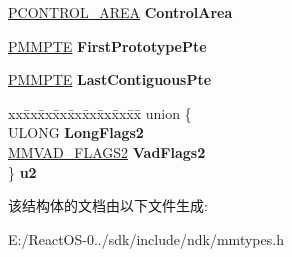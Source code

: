 \begin{DoxyCompactItemize}
\begin{tabbing}
\end{tabbing}\item 
\mbox{\label{struct___m_m_v_a_d_a6c0a9f2d6187cc0ea559bda1b7b99171}} 
\hyperlink{struct___c_o_n_t_r_o_l___a_r_e_a}{P\+C\+O\+N\+T\+R\+O\+L\+\_\+\+A\+R\+EA} {\bfseries Control\+Area}
\item 
\mbox{\label{struct___m_m_v_a_d_afce2d19b388eee856fc2e4c27828a530}} 
\hyperlink{struct___m_m_p_t_e}{P\+M\+M\+P\+TE} {\bfseries First\+Prototype\+Pte}
\item 
\mbox{\label{struct___m_m_v_a_d_aa517d3c2faecd9a2993a122fc45e9245}} 
\hyperlink{struct___m_m_p_t_e}{P\+M\+M\+P\+TE} {\bfseries Last\+Contiguous\+Pte}
\item 
\mbox{\label{struct___m_m_v_a_d_a174098dab2b42368b4d80e234b0d6236}} 
\begin{tabbing}
xx\=xx\=xx\=xx\=xx\=xx\=xx\=xx\=xx\=\kill
union \{\\
\>ULONG {\bfseries LongFlags2}\\
\>\hyperlink{struct___m_m_v_a_d___f_l_a_g_s2}{MMVAD\_FLAGS2} {\bfseries VadFlags2}\\
\} {\bfseries u2}\\

\end{tabbing}\end{DoxyCompactItemize}


该结构体的文档由以下文件生成\+:\begin{DoxyCompactItemize}
\item 
E\+:/\+React\+O\+S-\/0../sdk/include/ndk/mmtypes.\+h\end{DoxyCompactItemize}
